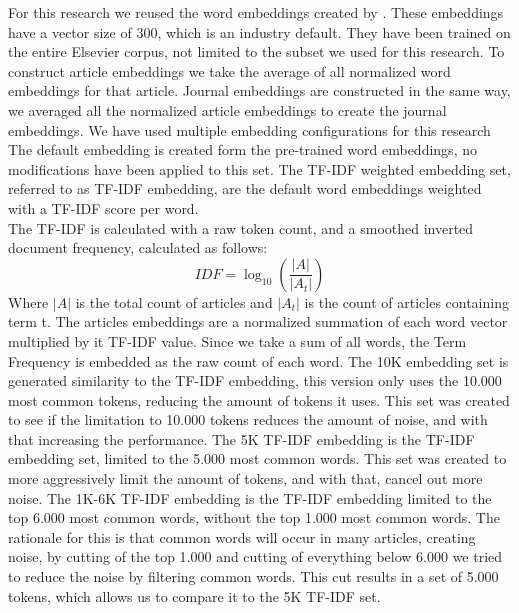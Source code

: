 \documentclass[../../Thesis.tex]{subfiles}
\begin{document}
For this research we reused the word embeddings created by \citet{Truong2017Thesis}. These embeddings have a vector size of 300, which is an industry default. They have been trained on the entire Elsevier corpus, not limited to the subset we used for this research. To construct article embeddings we take the average of all normalized word embeddings for that article. Journal embeddings are constructed in the same way, we averaged all the normalized article embeddings to create the journal embeddings. We have used multiple embedding configurations for this research
The default embedding is created form the pre-trained word embeddings, no modifications have been applied to this set.
The TF-IDF weighted embedding set, referred to as TF-IDF embedding, are the default word embeddings weighted with a TF-IDF score per word.\\
The TF-IDF is calculated with a raw token count, and a smoothed inverted document frequency, calculated as follows:\\
\begin{equation}
IDF = \log_{10}(\dfrac{|A|}{|A_t|})
\end{equation}
Where $|A|$ is the total count of articles and $|A_t|$ is the count of articles containing term t.
The articles embeddings are a normalized summation of each word vector multiplied by it TF-IDF value. Since we take a sum of all words, the Term Frequency is embedded as the raw count of each word.
The 10K embedding set is generated similarity to the TF-IDF embedding, this version only uses the 10.000 most common tokens, reducing the amount of tokens it uses. This set was created to see if the limitation to 10.000 tokens reduces the amount of noise, and with that increasing the performance.
The 5K TF-IDF embedding is the TF-IDF embedding set, limited to the 5.000 most common words. This set was created to more aggressively limit the amount of tokens, and with that, cancel out more noise.
The 1K-6K TF-IDF embedding is the TF-IDF embedding limited to the top 6.000 most common words, without the top 1.000 most common words. The rationale for this is that common words will occur in many articles, creating noise, by cutting of the top 1.000 and cutting of everything below 6.000 we tried to reduce the noise by filtering common words. This cut results in a set of 5.000 tokens, which allows us to compare it to the 5K TF-IDF set.
\end{document}
